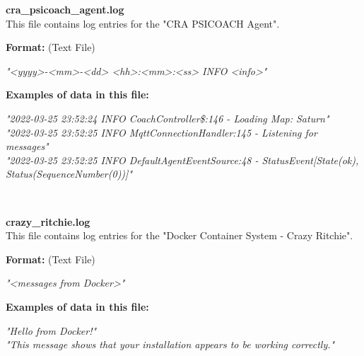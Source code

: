 \begin{description}
\begin{addmargin}[0em]{0em}
    \label{cra_psicoach_agent.log}
    \begin{addmargin}[1em]{0em} %
        \textbf{cra\_psicoach\_agent.log}\\
        This file contains log entries for the "CRA PSICOACH Agent".
        \begin{addmargin}[1em]{0em}
            \textbf{Format:} (Text File)
            \begin{addmargin}[1em]{0em}
                \textit{"<yyyy>-<mm>-<dd> <hh>:<mm>:<ss> INFO <info>"}
            \end{addmargin}
        \end{addmargin}
        \begin{addmargin}[1em]{0em}
            \textbf{Examples of data in this file:}
            \begin{addmargin}[1em]{0em}\textit{"2022-03-25 23:52:24 INFO  CoachController\$:146 - Loading Map: Saturn"\\
                "2022-03-25 23:52:25 INFO MqttConnectionHandler:145 - Listening for messages"\\
                "2022-03-25 23:52:25 INFO DefaultAgentEventSource:48 - StatusEvent[State(ok),\\Status(SequenceNumber(0))]"}
            \end{addmargin}
        \end{addmargin}
    \end{addmargin} %
    \textbf{\\}

    \label{crazy_ritchie.log}
    \begin{addmargin}[1em]{0em} %
        \textbf{crazy\_ritchie.log}\\
        This file contains log entries for the "Docker Container System - Crazy Ritchie".
        \begin{addmargin}[1em]{0em}
            \textbf{Format:} (Text File)
            \begin{addmargin}[1em]{0em}
                \textit{"<messages from Docker>"}
            \end{addmargin}
        \end{addmargin}
        \begin{addmargin}[1em]{0em}
            \textbf{Examples of data in this file:}
            \begin{addmargin}[1em]{0em}\textit{"Hello from Docker!"\\
                "This message shows that your installation appears to be working correctly."}
            \end{addmargin}
        \end{addmargin}
    \end{addmargin} %
    \textbf{\\}


\end{addmargin}
\end{description}

